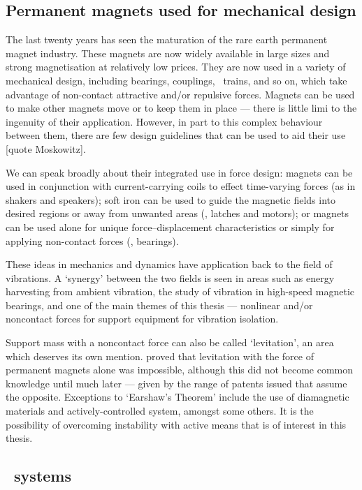\subsection{Permanent magnets used for mechanical design}

The last twenty years has seen the maturation of the rare earth permanent magnet industry. These magnets are now widely available in large sizes and strong magnetisation at relatively low prices. They are now used in a variety of mechanical design, including bearings, couplings, \maglev\ trains, and so on, which take advantage of non-contact attractive and/or repulsive forces.
Magnets can be used to make other magnets move or to keep them in place — there is little limi to the ingenuity of their application. However, in part to this complex behaviour between them, there are few design guidelines that can be used to aid their use [quote Moskowitz].

We can speak broadly about their integrated use in force design: magnets can be used in conjunction with current-carrying coils to effect time-varying forces (as in shakers and speakers); soft iron can be used to guide the magnetic fields into desired regions or away from unwanted areas (\eg, latches and motors); or magnets can be used alone for unique force--displacement characteristics or simply for applying non-contact forces (\eg, bearings).

These ideas in mechanics and dynamics have application back to the field of vibrations. A `synergy' between the two fields is seen in areas such as energy harvesting from ambient vibration, the study of vibration in high-speed magnetic bearings, and one of the main themes of this thesis — nonlinear and/or noncontact forces for support equipment for vibration isolation.

Support mass with a noncontact force can also be called `levitation', an area which deserves its own mention. \textcite{earnshaw1839} proved that levitation with the force of permanent magnets alone was impossible, although this did not become common knowledge
until much later — given by the range of patents issued that assume the opposite. Exceptions to `Earshaw's Theorem' include the use of diamagnetic materials and actively-controlled system, amongst some others. It is the possibility of overcoming instability with active means that is of interest in this thesis.

\subsection{\QZS\ systems}

